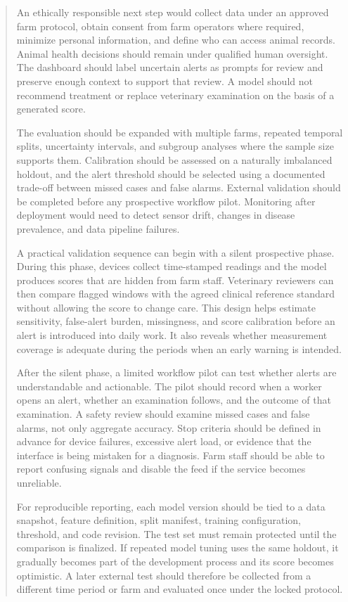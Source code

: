 \documentclass[journal]{IEEEtran}
\begin{document}
\begin{abstract}
An ethically responsible next step would collect data under an approved farm protocol, obtain consent from farm operators where required, minimize personal information, and define who can access animal records. Animal health decisions should remain under qualified human oversight. The dashboard should label uncertain alerts as prompts for review and preserve enough context to support that review. A model should not recommend treatment or replace veterinary examination on the basis of a generated score.

The evaluation should be expanded with multiple farms, repeated temporal splits, uncertainty intervals, and subgroup analyses where the sample size supports them. Calibration should be assessed on a naturally imbalanced holdout, and the alert threshold should be selected using a documented trade-off between missed cases and false alarms. External validation should be completed before any prospective workflow pilot. Monitoring after deployment would need to detect sensor drift, changes in disease prevalence, and data pipeline failures.

A practical validation sequence can begin with a silent prospective phase. During this phase, devices collect time-stamped readings and the model produces scores that are hidden from farm staff. Veterinary reviewers can then compare flagged windows with the agreed clinical reference standard without allowing the score to change care. This design helps estimate sensitivity, false-alert burden, missingness, and score calibration before an alert is introduced into daily work. It also reveals whether measurement coverage is adequate during the periods when an early warning is intended.

After the silent phase, a limited workflow pilot can test whether alerts are understandable and actionable. The pilot should record when a worker opens an alert, whether an examination follows, and the outcome of that examination. A safety review should examine missed cases and false alarms, not only aggregate accuracy. Stop criteria should be defined in advance for device failures, excessive alert load, or evidence that the interface is being mistaken for a diagnosis. Farm staff should be able to report confusing signals and disable the feed if the service becomes unreliable.

For reproducible reporting, each model version should be tied to a data snapshot, feature definition, split manifest, training configuration, threshold, and code revision. The test set must remain protected until the comparison is finalized. If repeated model tuning uses the same holdout, it gradually becomes part of the development process and its score becomes optimistic. A later external test should therefore be collected from a different time period or farm and evaluated once under the locked protocol.


\end{abstract}
\end{document}
